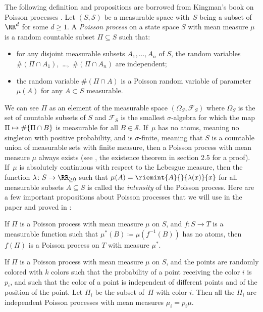 The following definition and propositions are borrowed from Kingman's book on Poisson processes \cite{Kingman93}. Let $(S, \mathcal S)$ be a measurable space with~$S$ being a subset of $\RR^d$ for some $d \ge 1$. A \textit{Poisson process} on a state space $S$ with mean measure $\mu$ is a random countable subset $\Pi \subseteq S$ such that:
\begin{itemize}
\item for any disjoint measurable subsets $A_1, \ldots, A_n$ of $S$, the random variables \hbox{$\#(\Pi \cap A_1)$, \dots, $\#(\Pi \cap A_n)$} are independent;

\item the random variable $\#(\Pi \cap A)$ is a Poisson random variable of parameter $\mu(A)$ for any $A\subset S$ measurable.
\end{itemize}
We can see $\Pi$ as an element of the measurable space $(\Omega_S, \mathcal F_S)$ where $\Omega_S$ is the set of countable subsets of $S$ and $\mathcal F_S$ is the smallest $\sigma$-algebra for which the map $\Pi \mapsto \#\{\Pi \cap\nobreak B\}$ is measurable for all $B \in \mathcal S$. If~$\mu$ has no atoms, meaning no singleton with positive probability, and is $\sigma$-finite, meaning that $S$ is a countable union of measurable sets with finite measure, then a Poisson process with mean measure $\mu$ always exists (see \cite{Kingman93}, the existence theorem in section 2.5 for a proof). If~$\mu$ is absolutely continuous with respect to the Lebesgue measure, then the function \hbox{$\lambda \colon S \to \RR_{\ge 0}$} such that $\mu(A) = \riemint{A}{}{\lambda(x)}{x}$ for all measurable subsets $A \subseteq S$ is called the \textit{intensity} of the Poisson process. Here are a few important propositions about Poisson processes that we will use in the paper and proved in \cite{Kingman93}:

\begin{prop}
\label{prel:map}
If $\Pi$ is a Poisson process with mean measure $\mu$ on $S$, and $f:S \to T$ is a measurable function such that $\mu^*(B) \coloneqq \mu(f^{-1}(B))$ has no atoms, then $f(\Pi)$ is a Poisson process on $T$ with measure $\mu^*$.
\end{prop}

\begin{prop}
\label{prel:color}
If $\Pi$ is a Poisson process with mean measure $\mu$ on $S$, and the points are randomly colored with $k$ colors such that the probability of a point receiving the color $i$ is $p_i$, and such that the color of a point is independent of different points and of the position of the point. Let $\Pi_i$ be the subset of~$\Pi$ with color $i$. Then all the $\Pi_i$ are independent Poisson processes with mean measures $\mu_i = p_i\mu$.
\end{prop}

